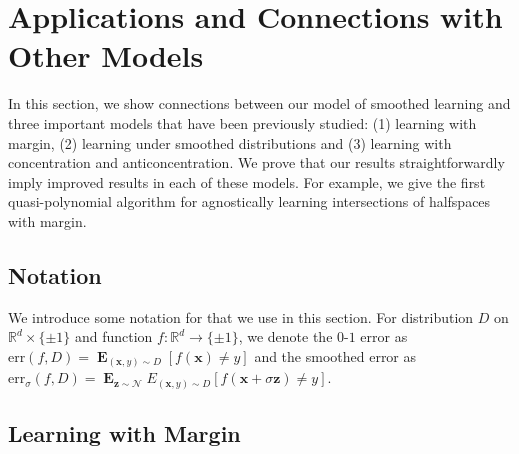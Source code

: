 \documentclass{theoretics}
\renewcommand\vec[1]{\mathbf{#1}}
\DeclareMathOperator*{\E}{\mathbf{E}}
\newcommand{\err}{\mathrm{err}}
\newcommand{\R}{\mathbb{R}}
\newcommand{\1}{\Ind}
\newcommand{\x}{\vec x}
\newcommand{\z}{\vec z}
\newcommand{\Gauss}{\mathcal{N}}
\begin{document}
\section{Applications and Connections with Other Models}
\label{app:applications}
In this section, we show connections between our model of smoothed learning and three important models that have been previously studied: (1) learning with margin, (2) learning under smoothed distributions and (3) learning with concentration and anticoncentration. We prove that our results straightforwardly imply improved results in each of these models. For example, we give the first quasi-polynomial algorithm for agnostically learning intersections of halfspaces with margin. 
\subsection{Notation}
We introduce some notation for that we use in this section. For distribution $D$ on $\R^{d}\times \{\pm 1\}$ and function $f:\R^{d}\to \{\pm 1\}$, we denote the $0$-$1$ error as $\err(f,D)=\E_{(\x,y)\sim D}[f(\x)\neq y]$ and the smoothed error as $\err_{\sigma}(f,D)=\E_{\z\sim \Gauss}E_{(\x,y)\sim D}[f(\x+\sigma\z)\neq y]$. %
\subsection{Learning with Margin}
\label{sec:margin}
\end{document}
